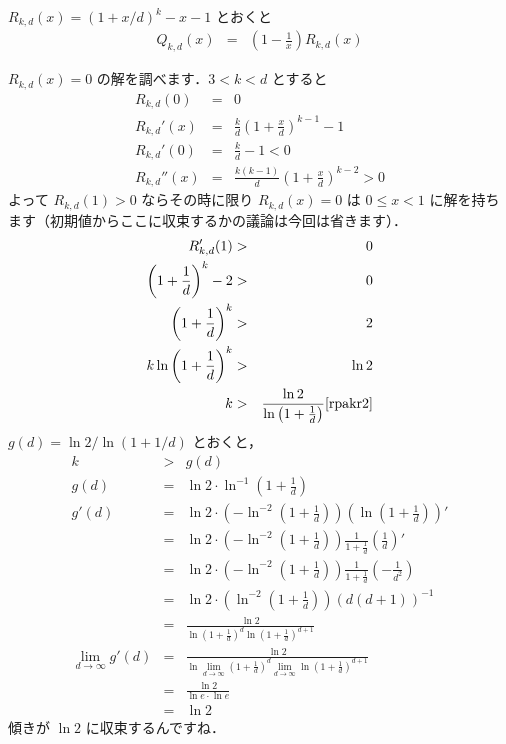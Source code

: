 \documentclass[a4j, 12pt]{jsarticle}
\renewcommand{\liminf}{\lim_{d\rightarrow\infty}}
\newcommand{\Q}{Q_{k,d}(x)}
\newcommand{\R}{R_{k,d}(x)}
\begin{document}
$\R = (1+x/d)^k-x-1$ とおくと
\begin{eqnarray}
  \Q&=&\left(1-\frac{1}{x}\right) \R
\end{eqnarray}

$\R=0$ の解を調べます．$3<k<d$ とすると
\begin{eqnarray}
  R_{k,d}(0)&=&0\\
  R_{k,d}' (x) &=& \frac{k}{d}\left(1+\frac{x}{d}\right)^{k-1}-1\\
  R_{k,d}' (0) &=& \frac{k}{d}-1 < 0\\
  R_{k,d}''(x) &=& \frac{k(k-1)}{d}\left(1+\frac{x}{d}\right)^{k-2}>0
\end{eqnarray}
よって $R_{k,d}(1)>0$ ならその時に限り $\R=0$ は $0 \leq x < 1$ に解を持ちます（初期値からここに収束するかの議論は今回は省きます）．
\begin{eqnarray}
  R_{k,d}'(1)&>&0\\
  \left(1+\frac{1}{d}\right)^k-2&>&0\\
  \left(1+\frac{1}{d}\right)^k&>&2\\
  k\ln\left(1+\frac{1}{d}\right)^k&>&\ln 2\\
  k&>&\frac{\ln 2}{\ln\left(1+\frac{1}{d}\right)} \cite{rpakr2}
\end{eqnarray}
$g(d)=\ln2/\ln(1+1/d)$ とおくと，
\begin{eqnarray}
  k&>&g(d)\\
  g(d) &=&\ln 2\cdot\ln^{-1}\left(1+\frac{1}{d}\right)\\
  g'(d)&=&\ln 2\cdot\left(-\ln^{-2}\left(1+\frac{1}{d}\right)\right)\left(\ln\left(1+\frac{1}{d}\right)\right)'\\
       &=&\ln 2\cdot\left(-\ln^{-2}\left(1+\frac{1}{d}\right)\right)\frac{1}{1+\frac{1}{d}}\left(\frac{1}{d}\right)'\\
       &=&\ln 2\cdot\left(-\ln^{-2}\left(1+\frac{1}{d}\right)\right)\frac{1}{1+\frac{1}{d}}\left(-\frac{1}{d^2}\right)\\
       &=&\ln 2\cdot\left( \ln^{-2}\left(1+\frac{1}{d}\right)\right)\left(d(d+1)\right)^{-1}\\
               &=&\frac{\ln 2}{        \ln\left(1+\frac{1}{d}\right)^d       \ln\left(1+\frac{1}{d}\right)^{d+1}}\\
  \liminf g'(d)&=&\frac{\ln 2}{\ln\liminf \left(1+\frac{1}{d}\right)^d\liminf\ln\left(1+\frac{1}{d}\right)^{d+1}}\\
               &=&\frac{\ln 2}{\ln e\cdot\ln e}\\
               &=&      \ln 2
\end{eqnarray}
傾きが $\ln 2$ に収束するんですね．
\end{document}
